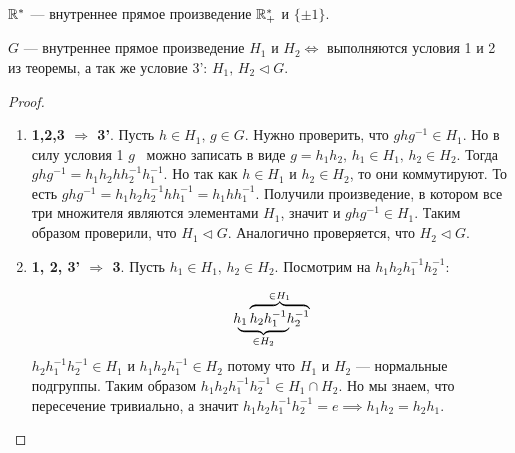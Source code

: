 \documentclass[../main.tex]{subfiles}
\begin{document}
\begin{example}
  $\mathbb{R}^{*}$ --- внутреннее прямое произведение $\mathbb{R}^{*}_{+}$ и $\{\pm 1\}$.
\end{example}

\begin{theorem-non}
  $G$ --- внутреннее прямое произведение $H_1$ и $H_2 \iff$ выполняются условия 1 и 2 из теоремы, а так же условие 3': $H_1,\, H_2 \triangleleft G$.
\end{theorem-non}
\begin{proof}
  \begin{enumerate}
    \item[] \textbf{1,2,3 $\Rightarrow$ 3'}. Пусть $h \in H_1, \, g \in G$. Нужно проверить, что $ghg^{-1} \in H_1$. Но в силу условия 1 $g$~ можно записать в виде $ g = h_1h_2, \, h_1 \in H_1, \, h_2 \in H_2$. Тогда $ghg^{-1} = h_1h_2hh_2^{-1}h_1^{-1}$. Но так как $h \in H_1$ и $h_2 \in H_2$, то они коммутируют. То есть $ghg^{-1} = h_1h_2h_2^{-1}hh_1^{-1} = h_1hh_1^{-1}$. Получили произведение, в котором все три множителя являются элементами $H_1$, значит и $ghg^{-1} \in H_1$. Таким образом проверили, что $H_1 \triangleleft G$. Аналогично проверяется, что $H_2 \triangleleft G$.
    \item[] \textbf{1, 2, 3' $\Rightarrow$ 3}. Пусть $h_1 \in H_1,\, h_2 \in H_2$. Посмотрим на $h_1h_2h_1^{-1}h_2^{-1}$:

  \begin{equation*}
    \rlap{
    $
    \underbrace{\phantom{h_1h_2h_1^{-1}}}_{\mathclap{
      \in H_2
    }}$}
    h_1
    \overbrace{h_2h_1^{-1}h_2^{-1}}^{\mathclap{
      \in H_1
    }}
  \end{equation*}
  $h_2h_1^{-1}h_2^{-1} \in H_1$ и $h_1h_2h_1^{-1} \in H_2$ потому что $H_1$ и $H_2$ --- нормальные подгруппы. Таким образом $h_1h_2h_1^{-1}h_2^{-1} \in H_1 \cap H_2$. Но мы знаем, что пересечение тривиально, а значит $h_1h_2h_1^{-1}h_2^{-1} = e \implies h_1h_2 = h_2h_1$.
  \end{enumerate}
\end{proof}
\end{document}
